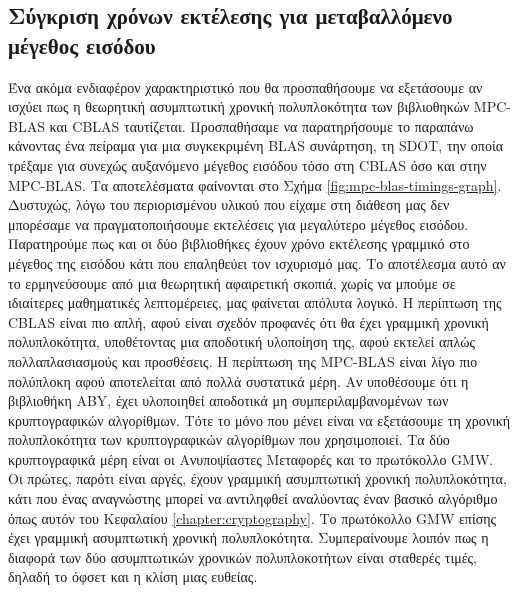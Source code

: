 
\subsection{Σύγκριση χρόνων εκτέλεσης για μεταβαλλόμενο μέγεθος εισόδου}

Ένα ακόμα ενδιαφέρον χαρακτηριστικό που θα προσπαθήσουμε να εξετάσουμε αν ισχύει πως η θεωρητική ασυμπτωτική χρονική πολυπλοκότητα των βιβλιοθηκών MPC-BLAS και CBLAS ταυτίζεται. Προσπαθήσαμε να παρατηρήσουμε το παραπάνω κάνοντας ένα πείραμα για μια συγκεκριμένη BLAS συνάρτηση, τη SDOT, την οποία τρέξαμε για συνεχώς αυξανόμενο μέγεθος εισόδου τόσο στη CBLAS όσο και στην MPC-BLAS. Τα αποτελέσματα φαίνονται στο Σχήμα \ref{fig:mpc-blas-timings-graph}. Δυστυχώς, λόγω του περιορισμένου υλικού που είχαμε στη διάθεση μας δεν μπορέσαμε να πραγματοποιήσουμε εκτελέσεις για μεγαλύτερο μέγεθος εισόδου. Παρατηρούμε πως και οι δύο βιβλιοθήκες έχουν χρόνο εκτέλεσης γραμμικό στο μέγεθος της εισόδου κάτι που επαληθεύει τον ισχυρισμό μας. Το αποτέλεσμα αυτό αν το ερμηνεύσουμε από μια θεωρητική αφαιρετική σκοπιά, χωρίς να μπούμε σε ιδιαίτερες μαθηματικές λεπτομέρειες, μας φαίνεται απόλυτα λογικό. Η περίπτωση της CBLAS είναι πιο απλή, αφού είναι σχεδόν προφανές ότι θα έχει γραμμική χρονική πολυπλοκότητα, υποθέτοντας μια αποδοτική υλοποίηση της, αφού εκτελεί απλώς πολλαπλασιασμούς και προσθέσεις. Η περίπτωση της MPC-BLAS είναι λίγο πιο πολύπλοκη αφού αποτελείται από πολλά συστατικά μέρη. Αν υποθέσουμε ότι η βιβλιοθήκη ABY, έχει υλοποιηθεί αποδοτικά μη συμπεριλαμβανομένων των κρυπτογραφικών αλγορίθμων. Τότε το μόνο που μένει είναι να εξετάσουμε τη χρονική πολυπλοκότητα των κρυπτογραφικών αλγορίθμων που χρησιμοποιεί. Τα δύο κρυπτογραφικά μέρη είναι οι Ανυποψίαστες Μεταφορές και το πρωτόκολλο GMW. Οι πρώτες, παρότι είναι αργές, έχουν γραμμική ασυμπτωτική χρονική πολυπλοκότητα, κάτι που ένας αναγνώστης μπορεί να αντιληφθεί αναλύοντας έναν βασικό αλγόριθμο όπως αυτόν του Κεφαλαίου \ref{chapter:cryptography}. Το πρωτόκολλο GMW επίσης έχει γραμμική ασυμπτωτική χρονική πολυπλοκότητα. Συμπεραίνουμε λοιπόν πως η διαφορά των δύο ασυμπτωτικών χρονικών πολυπλοκοτήτων είναι σταθερές τιμές, δηλαδή το όφσετ και η κλίση μιας ευθείας.

